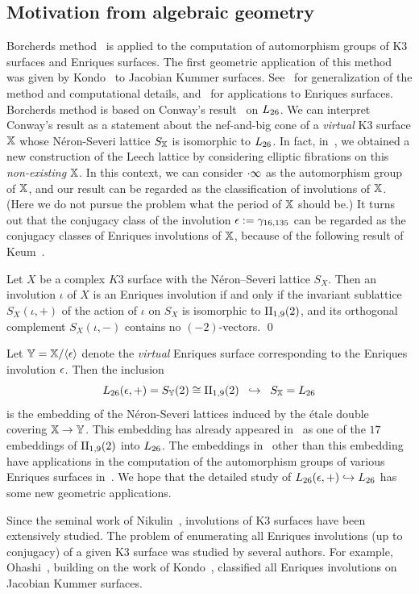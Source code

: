 \documentclass{amsart} %
\begin{document}
\subsection{Motivation from algebraic geometry}\label{subsec:alggeom}
%
Borcherds method~\cite{MR913200, MR1654763}
is applied to the computation of  automorphism groups of K3 surfaces and Enriques surfaces.
The first geometric application of this method was given 
by Kondo~\cite{MR1618132} to Jacobian Kummer surfaces.
See~\cite{MR3456710, MR4759604} for generalization of the method and computational details,
and~\cite{MR4498439, MR4389670} for applications to Enriques surfaces.
Borcherds method is based on Conway's result~\cite{MR690711} on $L_{26}$. 
We can interpret Conway's result 
as a statement about the nef-and-big cone of a \emph{virtual} K3 surface $\mathord{\mathbb{X}}$
 whose N\'eron-Severi  lattice $S_{\mathord{\mathbb{X}}}$  is isomorphic to $L_{26}$.
In fact,
in~\cite{MR4674939}, 
we obtained a new construction of the Leech lattice
by considering elliptic fibrations on this \emph{non-existing}   $\mathord{\mathbb{X}}$.
In this context, we can consider $\cdot \infty$ as 
the automorphism group of $\mathord{\mathbb{X}}$,
and our result can be regarded as the classification of involutions of $\mathord{\mathbb{X}}$.
(Here we do not pursue the problem what the period of $\mathord{\mathbb{X}}$ should be.)
It turns out that 
the conjugacy class of the involution $\epsilon:=\gamma_{16, 135}$ can be regarded 
 as the conjugacy classes of  Enriques involutions of $\mathord{\mathbb{X}}$,
 because of the following result of Keum~\cite{MR1060704}.
 \begin{proposition}
 Let $X$ be a complex  $K3$ surface
with  the N\'eron--Severi lattice $S_X$.
 Then an involution $\iota$ of $X$ is an Enriques involution
 if and only if the invariant sublattice $S_X(\iota, +)$ of 
 the action of $\iota$ on  $S_X$ 
 is isomorphic to $\mathrm{II}_{1,9} (2)$,
 and its orthogonal complement $S_X(\iota, -)$
contains no $(-2)$-vectors.
 \qed
 \end{proposition}
%
Let $\mathord{\mathbb{Y}}=\mathord{\mathbb{X}}/\langle {\epsilon} \rangle$ denote the  \emph{virtual} Enriques surface
corresponding to the Enriques involution $\epsilon$.
Then the inclusion  
\[
L_{26}(\epsilon, +)=S_{\mathord{\mathbb{Y}}}(2)\cong \mathrm{II}_{1,9} (2)\;\; \hookrightarrow \;\;S_{\mathord{\mathbb{X}}}=L_{26}
\]
is the embedding of the N\'eron-Severi  lattices
induced by the \'etale double covering $\mathord{\mathbb{X}}\to \mathord{\mathbb{Y}}$.
This embedding 
has already appeared in~\cite{MR4389670} as one of  the $17$ embeddings 
of $\mathrm{II}_{1,9} (2)$  into $L_{26}$.
The embeddings in~\cite{MR4389670} other than this embedding 
have applications in the computation of the automorphism groups
of various Enriques surfaces in~\cite{MR4498439}.
We hope that the detailed study of $L_{26}(\epsilon, +)\hookrightarrow L_{26}$
has some new geometric  applications.
%
\par
Since the seminal work of Nikulin~\cite{MR633160}, 
involutions of K3 surfaces have been extensively studied.
The problem of enumerating all Enriques involutions 
(up to conjugacy) of a given K3 surface was
studied by several authors.
For example,  Ohashi~\cite{MR2552959},
building on the work of Kondo~\cite{MR1618132}, 
 classified all Enriques involutions  on Jacobian Kummer surfaces. 
%
%
\end{document}
